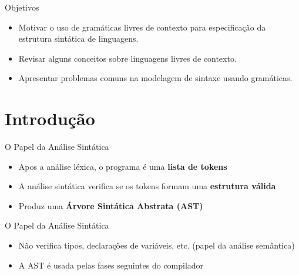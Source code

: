 \subtitle{\bf Aula 5 - Introdução}
\begin{frame}[t,plain]
    \titlepage
\end{frame}

\begin{frame}{Objetivos}

    \begin{itemize}
        \item
        Motivar o uso de gramáticas livres de contexto para especificação da
        estrutura sintática de linguagens.
        \item
        Revisar alguns conceitos sobre linguagens livres de contexto.
        \item
        Apresentar problemas comuns na modelagem de sintaxe usando gramáticas.
    \end{itemize}
\end{frame}


\section{Introdução}\label{introduuxe7uxe3o}

\begin{frame}{O Papel da Análise Sintática}

    \begin{itemize}

        \item
        Apos a análise léxica, o programa é uma \textbf{lista de tokens}
        \item
        A análise sintática verifica se os tokens formam uma \textbf{estrutura
        válida}
        \item
        Produz uma \textbf{Árvore Sintática Abstrata (AST)}
    \end{itemize}
\end{frame}

\begin{frame}{O Papel da Análise Sintática}

    \begin{itemize}

        \item
        Não verifica tipos, declarações de variáveis, etc. (papel da análise
        semântica)
        \item
        A AST é usada pelas fases seguintes do compilador
    \end{itemize}
\end{frame}

